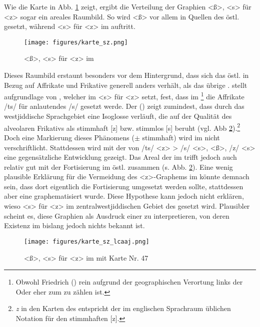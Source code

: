 Wie die Karte in Abb. \ref{kartesz} zeigt, ergibt die Verteilung der Graphien <ß>, <s> für <z> sogar ein areales Raumbild. So wird <ß> vor allem in Quellen des östl.  gesetzt, während <s> für <z> im  auftritt.\\


 \begin{figure}[h!]
		\centering
\texttt{[image: figures/karte\_sz.png]}
		\caption{\label{kartesz} <ß>, <s> für <z> im }
		\end{figure}
\FloatBarrier


Dieses Raumbild erstaunt besonders vor dem Hintergrund, dass sich das östl.  in Bezug auf Affrikate und Frikative generell anders verhält, als das übrige . \textcite[1028]{Katz1983} stellt aufgrundlage von \textcite{Friedrich1784}, welcher im  <s> für <z> setzt, fest, dass im \footnote{Obwohl Friedrich (\citeyear{Friedrich1784}) rein aufgrund der geographischen Verortung links der Oder eher zum  zu zählen ist.} die Affrikate /ts/ für anlautendes /s/ gesetzt werde. Der  (\citeyear[Karten 47, 48, 49]{Herzog1992}) zeigt zumindest, dass durch das westjiddische Sprachgebiet eine Isoglosse verläuft, die auf der Qualität des alveolaren Frikativs als stimmhaft [z] bzw. stimmlos [s] beruht (vgl. Abb \ref{karteszlcaaj}).\footnote{\textit{z} in den Karten des  entspricht der im englischen Sprachraum üblichen Notation für den stimmhaften  [z].} 
Doch eine Markierung dieses Phänomens ($\pm$ stimmhaft) wird im  nicht verschriftlicht. Stattdessen wird mit der  von /ts/ <z> > /s/ <s>, <ß>, /z/ <s> eine gegensätzliche Entwicklung gezeigt. Das Areal der  im  trifft jedoch auch relativ gut mit der Fortisierung im östl. zusammen (s. Abb. \ref{karteszlcaaj}). Eine wenig plausible Erklärung für die Vermeidung des <z>-Graphems im  könnte demnach sein, dass dort eigentlich die Fortisierung umgesetzt werden sollte, stattdessen aber eine  graphematisiert wurde. Diese Hypothese kann jedoch nicht erklären, wieso <s> für <z> im zentralwestjiddischen Gebiet des  gesetzt wird. Plausibler scheint es, diese Graphien als Ausdruck einer  zu interpretieren, von deren Existenz im  bislang jedoch nichts bekannt ist.\\

 \begin{figure}[h!]
		\centering
\texttt{[image: figures/karte\_sz\_lcaaj.png]}
		\caption{\label{karteszlcaaj} <ß>, <s> für <z> im  mit  Karte Nr. 47}
		\end{figure}
\FloatBarrier



